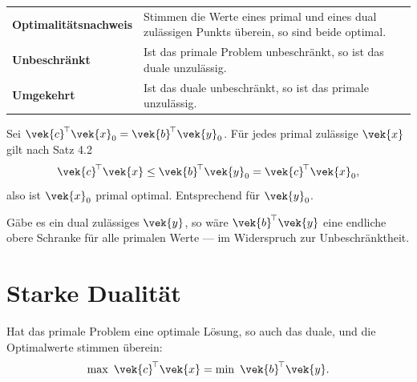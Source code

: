 \begin{merksatz}
\begin{center}
{\small
\renewcommand{\arraystretch}{1.52}
\begin{tabular}{@{}P{3.2cm}P{5.4cm}@{}}
\toprule
\textbf{Optimalitäts\-nachweis} & Stimmen die Werte eines primal und eines dual zulässigen Punkts überein, so sind beide optimal.\\
\textbf{Unbeschränkt} & Ist das primale Problem unbeschränkt, so ist das duale unzulässig.\\
\textbf{Umgekehrt} & Ist das duale unbeschränkt, so ist das primale unzulässig.\\
\bottomrule
\end{tabular}}
\end{center}

Sei $\vek{c}^{\!\top}\vek{x}_0 = \vek{b}^{\!\top}\vek{y}_0$. Für jedes primal zulässige $\vek{x}$ gilt nach Satz 4.2
\[ \vek{c}^{\!\top}\vek{x} \le \vek{b}^{\!\top}\vek{y}_0 = \vek{c}^{\!\top}\vek{x}_0 , \]
also ist $\vek{x}_0$ primal optimal. Entsprechend für $\vek{y}_0$. \checkmark

Gäbe es ein dual zulässiges $\vek{y}$, so wäre $\vek{b}^{\!\top}\vek{y}$ eine endliche obere Schranke für alle primalen Werte --- im Widerspruch zur Unbeschränktheit. \checkmark

\begin{center}
\begin{minipage}{0.88\textwidth}
\end{minipage}
\end{center}
\end{merksatz}

\section{Starke Dualität}

\begin{merksatz}
Hat das primale Problem eine optimale Lösung, so auch das duale, und die Optimalwerte stimmen überein:
\[ \max\ \vek{c}^{\!\top}\vek{x} = \min\ \vek{b}^{\!\top}\vek{y} . \]
\end{merksatz}

